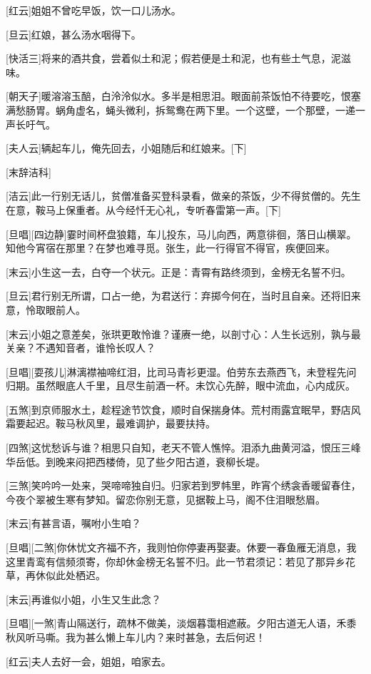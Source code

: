 \documentclass{book}
\begin{document}
[红云]姐姐不曾吃早饭，饮一口儿汤水。

[旦云]红娘，甚么汤水咽得下。

[快活三]将来的酒共食，尝着似土和泥；假若便是土和泥，也有些土气息，泥滋味。

[朝天子]暖溶溶玉醅，白泠泠似水。多半是相思泪。眼面前茶饭怕不待要吃，恨塞满愁肠胃。蜗角虚名，蝇头微利，拆鸳鸯在两下里。一个这壁，一个那壁，一递一声长吁气。

[夫人云]辆起车儿，俺先回去，小姐随后和红娘来。[下]

[末辞洁科]

[洁云]此一行别无话儿，贫僧准备买登科录看，做亲的茶饭，少不得贫僧的。先生在意，鞍马上保重者。从今经忏无心礼，专听春雷第一声。[下]

[旦唱][四边静]霎时间杯盘狼籍，车儿投东，马儿向西，两意徘徊，落日山横翠。知他今宵宿在那里？在梦也难寻觅。张生，此一行得官不得官，疾便回来。

[末云]小生这一去，白夺一个状元。正是：青霄有路终须到，金榜无名誓不归。

[旦云]君行别无所谓，口占一绝，为君送行：弃掷今何在，当时且自亲。还将旧来意，怜取眼前人。

[末云]小姐之意差矣，张珙更敢怜谁？谨赓一绝，以剖寸心：人生长远别，孰与最关亲？不遇知音者，谁怜长叹人？

[旦唱][耍孩儿]淋漓襟袖啼红泪，比司马青衫更湿。伯劳东去燕西飞，未登程先问归期。虽然眼底人千里，且尽生前酒一杯。未饮心先醉，眼中流血，心内成灰。

[五煞]到京师服水土，趁程途节饮食，顺时自保揣身体。荒村雨露宜眠早，野店风霜要起迟。鞍马秋风里，最难调护，最要扶持。

[四煞]这忧愁诉与谁？相思只自知，老天不管人憔悴。泪添九曲黄河溢，恨压三峰华岳低。到晚来闷把西楼倚，见了些夕阳古道，衰柳长堤。

[三煞]笑吟吟一处来，哭啼啼独自归。归家若到罗帏里，昨宵个绣衾香暖留春住，今夜个翠被生寒有梦知。留恋你别无意，见据鞍上马，阁不住泪眼愁眉。

[末云]有甚言语，嘱咐小生咱？

[旦唱][二煞]你休忧文齐福不齐，我则怕你停妻再娶妻。休要一春鱼雁无消息，我这里青鸾有信频须寄，你却休金榜无名誓不归。此一节君须记：若见了那异乡花草，再休似此处栖迟。

[末云]再谁似小姐，小生又生此念？

[旦唱][一煞]青山隔送行，疏林不做美，淡烟暮霭相遮蔽。夕阳古道无人语，禾黍秋风听马嘶。我为甚么懒上车儿内？来时甚急，去后何迟！

[红云]夫人去好一会，姐姐，咱家去。
\end{document}
